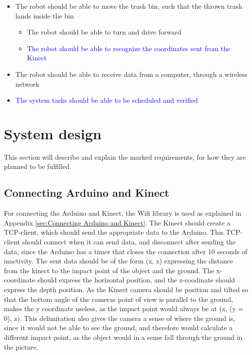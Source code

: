 \begin{itemize}
\begin{itemize}
	\end{itemize}
	\item The robot should be able to move the trash bin, such that the thrown trash lands inside the bin
	\begin{itemize}
		\item {The robot should be able to turn and drive forward}
		\item\textcolor{blue}{The robot should be able to recognize the coordinates sent from the Kinect}
	\end{itemize}
	\item {The robot should be able to receive data from a computer, through a wireless network}
	\item \textcolor{blue}{The system tasks should be able to be scheduled and verified}
\end{itemize}

\section{System design}
\label{sec:i3System design}
This section will describe and explain the marked requirements, for how they are planned to be fulfilled.

\subsection{Connecting Arduino and Kinect}
\label{sec:i3Connecting Arduino and Kinect system design}
For connecting the Arduino and Kinect, the Wifi library is used as explained in Appendix \ref{sec:Connecting Arduino and Kinect}. The Kinect should create a TCP-client, which should send the appropriate data to the Arduino. This TCP-client should connect when it can send data, and disconnect after sending the data, since the Arduino has a timer that closes the connection after 10 seconds of inactivity. The sent data should be of the form (x, z) expressing the distance from the kinect to the impact point of the object and the ground. The x-coordinate should express the horizontal position, and the z-coodinate should express the depth position. As the Kinect camera should be position and tilted so that the bottom angle of the cameras point of view is parallel to the ground, makes the y coordinate useless, as the impact point would always be at (x, (y = 0), z). This delimitation also gives the camera a sense of where the ground is, since it would not be able to see the ground, and therefore would calculate a different impact point, as the object would in a sense fall through the ground in the picture. 

